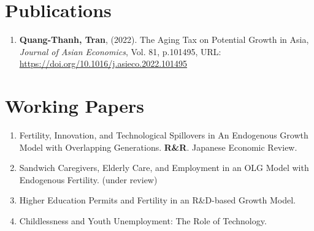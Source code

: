 \section{\sc Publications}
\begin{enumerate}
\item
  {\bf Quang-Thanh, Tran},
  (2022).
  {The Aging Tax on Potential Growth in Asia},
  {\it Journal of Asian Economics}, Vol. 81, p.101495,
  {URL: \url{https://doi.org/10.1016/j.asieco.2022.101495}}
\end{enumerate}

\vspace{4mm}

\section{\sc Working Papers}
\begin{enumerate}
 \item
  {Fertility, Innovation, and Technological Spillovers in An Endogenous Growth Model with Overlapping Generations}. \textbf{R\&R}. Japanese Economic Review.
  \item Sandwich Caregivers, Elderly Care, and Employment in an OLG Model with Endogenous Fertility. (under review)
  \item Higher Education Permits and Fertility in an R\&D-based Growth Model.
  \item Childlessness and Youth Unemployment: The Role of Technology.
\end{enumerate}


